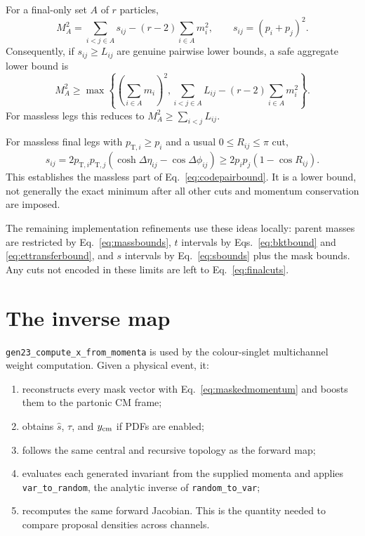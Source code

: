 \documentclass[11pt,a4paper]{article}
\newcommand{\shat}{\hat{s}}
\newcommand{\code}[1]{\texttt{#1}}
\begin{document}
For a final-only set $A$ of $r$ particles,
\begin{equation}
 M_A^2=\sum_{i<j\in A}s_{ij}-(r-2)\sum_{i\in A}m_i^2,
 \qquad s_{ij}=(p_i+p_j)^2.
 \label{eq:subsetidentity}
\end{equation}
Consequently, if $s_{ij}\geq L_{ij}$ are genuine pairwise lower bounds, a
safe aggregate lower bound is
\begin{equation}
 M_A^2\geq
 \max\left\{(\sum_{i\in A}m_i)^2,
 \sum_{i<j\in A}L_{ij}-(r-2)\sum_{i\in A}m_i^2\right\}.
 \label{eq:exactaggregatebound}
\end{equation}
For massless legs this reduces to $M_A^2\geq\sum_{i<j}L_{ij}$.

For massless final legs with $p_{\mathrm{T},i}\geq p_i$ and a usual
$0\leq R_{ij}\leq\pi$ cut,
\begin{equation}
 s_{ij}=2p_{\mathrm{T},i}p_{\mathrm{T},j}\left(\cosh\Delta\eta_{ij}-\cos\Delta\phi_{ij}\right)
 \geq2p_ip_j(1-\cos R_{ij}).
 \label{eq:drbound}
\end{equation}
This establishes the massless part of Eq.~\eqref{eq:codepairbound}.  It is a
lower bound, not generally the exact minimum after all other cuts and momentum
conservation are imposed.

The remaining implementation refinements use these ideas locally: parent
masses are restricted by Eq.~\eqref{eq:massbounds}, $t$ intervals by
Eqs.~\eqref{eq:bktbound} and \eqref{eq:ettransferbound}, and $s$ intervals by
Eq.~\eqref{eq:sbounds} plus the mask bounds.  Any cuts not encoded in these
limits are left to Eq.~\eqref{eq:finalcuts}.

\section{The inverse map}

\code{gen23\_compute\_x\_from\_momenta} is used by the colour-singlet
multichannel weight computation.  Given a physical event, it:

\begin{enumerate}
\item reconstructs every mask vector with Eq.~\eqref{eq:maskedmomentum} and
  boosts them to the partonic CM frame;
\item obtains $\shat$, $\tau$, and $y_{\rm cm}$ if PDFs are enabled;
\item follows the same central and recursive topology as the forward map;
\item evaluates each generated invariant from the supplied momenta and applies
  \code{var\_to\_random}, the analytic inverse of
  \code{random\_to\_var};
\item recomputes the same forward Jacobian.  This is the quantity needed to
  compare proposal densities across channels.
\end{enumerate}
\end{document}
